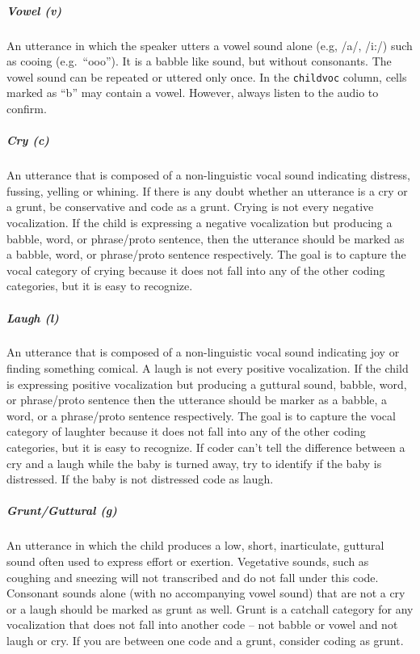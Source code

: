\documentclass[
]{book}
\begin{document}
\hypertarget{vowel}{%
\subparagraph*{Vowel (v)}\label{vowel}}

An utterance in which the speaker utters a vowel sound alone (e.g, /a/, /i:/) such as cooing (e.g.~``ooo''). It is a babble like sound, but without consonants. The vowel sound can be repeated or uttered only once. In the \texttt{childvoc} column, cells marked as ``b'' may contain a vowel. However, always listen to the audio to confirm.

\hypertarget{cry}{%
\subparagraph*{Cry (c)}\label{cry}}

An utterance that is composed of a non-linguistic vocal sound indicating distress, fussing, yelling or whining. If there is any doubt whether an utterance is a cry or a grunt, be conservative and code as a grunt. Crying is not every negative vocalization. If the child is expressing a negative vocalization but producing a babble, word, or phrase/proto sentence, then the utterance should be marked as a babble, word, or phrase/proto sentence respectively. The goal is to capture the vocal category of crying because it does not fall into any of the other coding categories, but it is easy to recognize.

\hypertarget{laugh}{%
\subparagraph*{Laugh (l)}\label{laugh}}

An utterance that is composed of a non-linguistic vocal sound indicating joy or finding something comical. A laugh is not every positive vocalization. If the child is expressing positive vocalization but producing a guttural sound, babble, word, or phrase/proto sentence then the utterance should be marker as a babble, a word, or a phrase/proto sentence respectively. The goal is to capture the vocal category of laughter because it does not fall into any of the other coding categories, but it is easy to recognize. If coder can't tell the difference between a cry and a laugh while the baby is turned away, try to identify if the baby is distressed. If the baby is not distressed code as laugh.

\hypertarget{grunt_guttural}{%
\subparagraph*{Grunt/Guttural (g)}\label{grunt_guttural}}

An utterance in which the child produces a low, short, inarticulate, guttural sound often used to express effort or exertion. Vegetative sounds, such as coughing and sneezing will not transcribed and do not fall under this code. Consonant sounds alone (with no accompanying vowel sound) that are not a cry or a laugh should be marked as grunt as well. Grunt is a catchall category for any vocalization that does not fall into another code -- not babble or vowel and not laugh or cry. If you are between one code and a grunt, consider coding as grunt.
\end{document}
